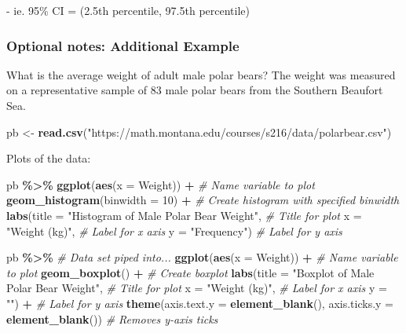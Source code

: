 \documentclass[
]{report}
\newenvironment{Shaded}{\begin{snugshade}}{\end{snugshade}}
\newcommand{\AttributeTok}[1]{\textcolor[rgb]{0.13,0.29,0.53}{#1}}
\newcommand{\CommentTok}[1]{\textcolor[rgb]{0.56,0.35,0.01}{\textit{#1}}}
\newcommand{\DecValTok}[1]{\textcolor[rgb]{0.00,0.00,0.81}{#1}}
\newcommand{\FunctionTok}[1]{\textcolor[rgb]{0.13,0.29,0.53}{\textbf{#1}}}
\newcommand{\NormalTok}[1]{#1}
\newcommand{\OtherTok}[1]{\textcolor[rgb]{0.56,0.35,0.01}{#1}}
\newcommand{\SpecialCharTok}[1]{\textcolor[rgb]{0.81,0.36,0.00}{\textbf{#1}}}
\newcommand{\StringTok}[1]{\textcolor[rgb]{0.31,0.60,0.02}{#1}}
\newcommand{\rgi}{\hspace{24pt}}  %
\begin{document}
\rgi \rgi - ie. 95\% CI = (2.5th percentile, 97.5th percentile)


\subsubsection*{Optional notes: Additional Example}\label{optional-notes-additional-example-5}

What is the average weight of adult male polar bears? The weight was measured on a representative sample of 83 male polar bears from the Southern Beaufort Sea.

\begin{Shaded}
\begin{Highlighting}[]
\NormalTok{pb }\OtherTok{\textless{}{-}} \FunctionTok{read.csv}\NormalTok{(}\StringTok{"https://math.montana.edu/courses/s216/data/polarbear.csv"}\NormalTok{)}
\end{Highlighting}
\end{Shaded}

Plots of the data:

\begin{Shaded}
\begin{Highlighting}[]
\NormalTok{pb }\SpecialCharTok{\%\textgreater{}\%}
    \FunctionTok{ggplot}\NormalTok{(}\FunctionTok{aes}\NormalTok{(}\AttributeTok{x =}\NormalTok{ Weight)) }\SpecialCharTok{+}   \CommentTok{\# Name variable to plot}
    \FunctionTok{geom\_histogram}\NormalTok{(}\AttributeTok{binwidth =} \DecValTok{10}\NormalTok{) }\SpecialCharTok{+}  \CommentTok{\# Create histogram with specified binwidth}
    \FunctionTok{labs}\NormalTok{(}\AttributeTok{title =} \StringTok{"Histogram of Male Polar Bear Weight"}\NormalTok{, }\CommentTok{\# Title for plot}
       \AttributeTok{x =} \StringTok{"Weight (kg)"}\NormalTok{, }\CommentTok{\# Label for x axis}
       \AttributeTok{y =} \StringTok{"Frequency"}\NormalTok{) }\CommentTok{\# Label for y axis}

\NormalTok{pb }\SpecialCharTok{\%\textgreater{}\%} \CommentTok{\# Data set piped into...}
\FunctionTok{ggplot}\NormalTok{(}\FunctionTok{aes}\NormalTok{(}\AttributeTok{x =}\NormalTok{ Weight)) }\SpecialCharTok{+}   \CommentTok{\# Name variable to plot}
  \FunctionTok{geom\_boxplot}\NormalTok{() }\SpecialCharTok{+}  \CommentTok{\# Create boxplot}
  \FunctionTok{labs}\NormalTok{(}\AttributeTok{title =} \StringTok{"Boxplot of Male Polar Bear Weight"}\NormalTok{, }\CommentTok{\# Title for plot}
       \AttributeTok{x =} \StringTok{"Weight (kg)"}\NormalTok{, }\CommentTok{\# Label for x axis}
       \AttributeTok{y =} \StringTok{""}\NormalTok{) }\SpecialCharTok{+} \CommentTok{\# Label for y axis}
    \FunctionTok{theme}\NormalTok{(}\AttributeTok{axis.text.y =} \FunctionTok{element\_blank}\NormalTok{(), }
          \AttributeTok{axis.ticks.y =} \FunctionTok{element\_blank}\NormalTok{()) }\CommentTok{\# Removes y{-}axis ticks}
\end{Highlighting}
\end{Shaded}
\end{document}
